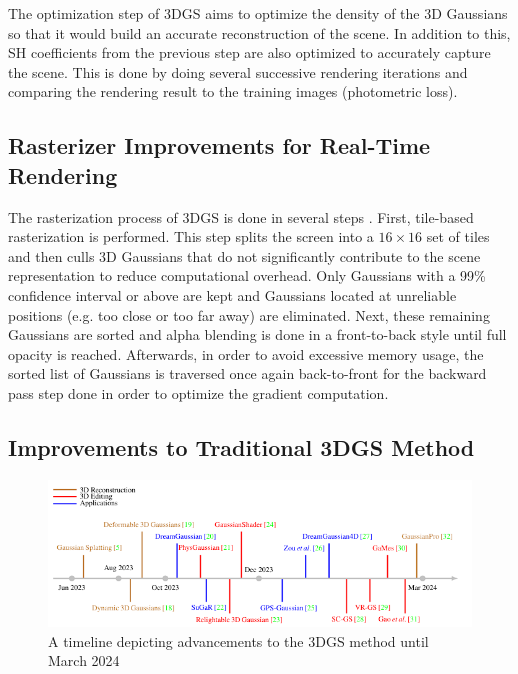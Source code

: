 The optimization step of 3DGS aims to optimize the density of the 3D Gaussians so that it would build an accurate reconstruction of the scene. In addition to this, SH coefficients from the previous step are also optimized to accurately capture the scene. This is done by doing several successive rendering iterations and comparing the rendering result to the training images (photometric loss).  

\subsection{Rasterizer Improvements for Real-Time Rendering}

The rasterization process of 3DGS is done in several steps \parencite{3DGS}. First, tile-based rasterization is performed. This step splits the screen into a \(16 \times 16\) set of tiles and then culls 3D Gaussians that do not significantly contribute to the scene representation to reduce computational overhead. Only Gaussians with a 99\% confidence interval or above are kept and Gaussians located at unreliable positions (e.g. too close or too far away) are eliminated. Next, these remaining Gaussians are sorted and alpha blending is done in a front-to-back style until full opacity is reached. Afterwards, in order to avoid excessive memory usage, the sorted list of Gaussians is traversed once again back-to-front for the backward pass step done in order to optimize the gradient computation.

\subsection{Improvements to Traditional 3DGS Method}

\begin{figure}[h]
    \centering
    \includegraphics[width=1.0\linewidth]{figures/3dgs-timeline.png}
    \caption{A timeline depicting advancements to the 3DGS method until March 2024 \parencite{3dgs-timeline}}
    \label{fig:3dgs-timeline}
\end{figure}

